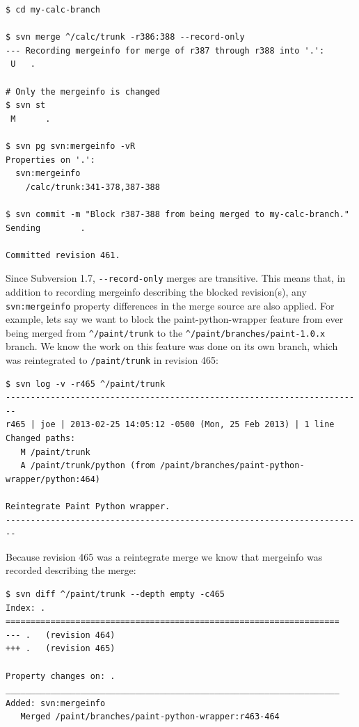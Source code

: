 \begin{verbatim}
$ cd my-calc-branch

$ svn merge ^/calc/trunk -r386:388 --record-only
--- Recording mergeinfo for merge of r387 through r388 into '.':
 U   .

# Only the mergeinfo is changed
$ svn st
 M      .

$ svn pg svn:mergeinfo -vR
Properties on '.':
  svn:mergeinfo
    /calc/trunk:341-378,387-388

$ svn commit -m "Block r387-388 from being merged to my-calc-branch."
Sending        .

Committed revision 461.
\end{verbatim}

Since Subversion 1.7, \texttt{-\/-record-only} merges are transitive.
This means that, in addition to recording mergeinfo describing the
blocked revision(s), any \texttt{svn:mergeinfo} property differences in
the merge source are also applied. For example, let\textquotesingle s
say we want to block the
\textquotesingle paint-python-wrapper\textquotesingle{} feature from
ever being merged from \texttt{\^{}/paint/trunk} to the
\texttt{\^{}/paint/branches/paint-1.0.x} branch. We know the work on
this feature was done on its own branch, which was reintegrated to
\texttt{/paint/trunk} in revision 465:

\begin{verbatim}
$ svn log -v -r465 ^/paint/trunk
------------------------------------------------------------------------
r465 | joe | 2013-02-25 14:05:12 -0500 (Mon, 25 Feb 2013) | 1 line
Changed paths:
   M /paint/trunk
   A /paint/trunk/python (from /paint/branches/paint-python-wrapper/python:464)

Reintegrate Paint Python wrapper.
------------------------------------------------------------------------
\end{verbatim}

Because revision 465 was a reintegrate merge we know that mergeinfo was
recorded describing the merge:

\begin{verbatim}
$ svn diff ^/paint/trunk --depth empty -c465
Index: .
===================================================================
--- .   (revision 464)
+++ .   (revision 465)

Property changes on: .
___________________________________________________________________
Added: svn:mergeinfo
   Merged /paint/branches/paint-python-wrapper:r463-464
\end{verbatim}

